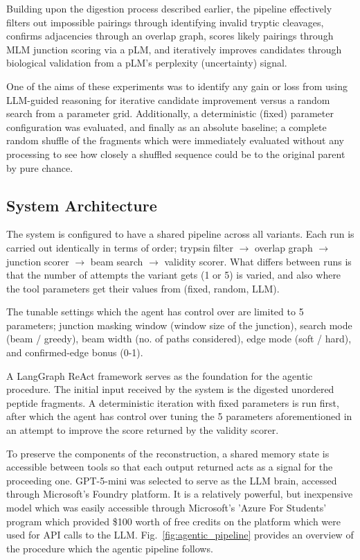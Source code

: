 \documentclass[journal]{IEEEtran}
\begin{document}
Building upon the digestion process described earlier,
the pipeline effectively filters out impossible pairings through identifying invalid tryptic cleavages, confirms adjacencies through
an overlap graph, scores likely pairings through MLM junction scoring via a pLM, and iteratively improves candidates through
biological validation from a pLM's perplexity (uncertainty) signal.

One of the aims of these experiments was to identify any gain or loss from using LLM-guided reasoning
for iterative candidate improvement versus a random search from a parameter grid. Additionally, a 
deterministic (fixed) parameter configuration was evaluated, and finally as an absolute baseline; a complete
random shuffle of the fragments which were immediately evaluated without any processing
to see how closely a shuffled sequence could be to the original parent by pure chance.

\subsection{System Architecture}
The system is configured to have a shared pipeline across all variants. Each run is carried out
identically in terms of order; trypsin filter $\rightarrow$ overlap graph $\rightarrow$ junction scorer $\rightarrow$
beam search $\rightarrow$ validity scorer. What differs between runs is that the number
of attempts the variant gets (1 or 5) is varied, and also where the tool parameters get their values from (fixed, random, LLM).

The tunable settings which the agent has control over are limited to 5 parameters; 
junction masking window (window size of the junction), search mode (beam / greedy), 
beam width (no. of paths considered), edge mode (soft / hard), and confirmed-edge bonus (0-1).

A LangGraph ReAct framework serves as the foundation for the agentic procedure. The initial input received
by the system is the digested unordered peptide fragments. A deterministic iteration with fixed parameters is run first,
after which the agent has control over tuning the 5 parameters aforementioned in an attempt to improve the score
returned by the validity scorer.

To preserve the components of the reconstruction, a shared memory state is accessible between tools
so that each output returned acts as a signal for the proceeding one. GPT-5-mini was
selected to serve as the LLM brain, accessed through Microsoft's Foundry platform. It is a relatively powerful, but inexpensive
model which was easily accessible through Microsoft's 'Azure For Students' program which provided \$100 worth of free
credits on the platform which were used for API calls to the LLM. Fig.~\ref{fig:agentic_pipeline}
provides an overview of the procedure which the agentic pipeline follows.
\end{document}
